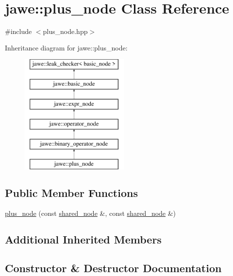 \hypertarget{classjawe_1_1plus__node}{}\section{jawe\+:\+:plus\+\_\+node Class Reference}
\label{classjawe_1_1plus__node}


{\ttfamily \#include $<$plus\+\_\+node.\+hpp$>$}

Inheritance diagram for jawe\+:\+:plus\+\_\+node\+:\begin{figure}[H]
\begin{center}
\leavevmode
\includegraphics[height=6.000000cm]{classjawe_1_1plus__node}
\end{center}
\end{figure}
\subsection*{Public Member Functions}
\begin{DoxyCompactItemize}
\item 
\hyperlink{classjawe_1_1plus__node_a7b0efb714299cb2f495cd9928bbe6777}{plus\+\_\+node} (const \hyperlink{namespacejawe_a3f307481d921b6cbb50cc8511fc2b544}{shared\+\_\+node} \&, const \hyperlink{namespacejawe_a3f307481d921b6cbb50cc8511fc2b544}{shared\+\_\+node} \&)
\end{DoxyCompactItemize}
\subsection*{Additional Inherited Members}


\subsection{Constructor \& Destructor Documentation}
\mbox{\label{classjawe_1_1plus__node_a7b0efb714299cb2f495cd9928bbe6777}} 
